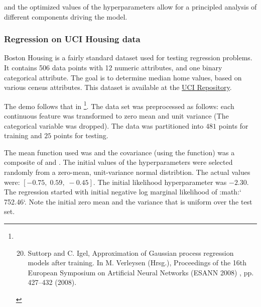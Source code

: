 \documentclass[letterpaper,10pt,english]{sphinxmanual}
\begin{document}
and the optimized values of the hyperparameters allow for a principled analysis of different components driving the model.


\subsubsection{Regression on UCI Housing data}
\label{demoHousing::doc}\label{demoHousing:regression-on-uci-housing-data}\label{demoHousing:gpml}
Boston Housing is a fairly standard dataset used for testing regression problems. It contains 506 data points with 12 numeric attributes, and one binary
categorical attribute.  The goal is to determine median home values, based on various census attributes. This dataset is available at the \href{http://archive.ics.uci.edu/ml/datasets/Housing}{UCI
Repository}.

The demo follows that in \footnote{\begin{enumerate}
\setcounter{enumi}{19}
\item {} 
Suttorp and C. Igel, Approximation of Gaussian process regression models after training. In M. Verleysen (Hrsg.), Proceedings of the 16th European Symposium on Artificial Neural Networks (ESANN 2008) , pp. 427–432 (2008).

\end{enumerate}
}.  The data set was preprocessed as follows: each continuous feature was transformed to zero mean and
unit variance (The categorical variable was dropped).  The data was partitioned into $481$ points for training and $25$ points for testing.

The mean function used was  and the covariance (using the  function) was a composite of
 and .  The initial values of the hyperparameters were selected randomly from a zero-mean,
unit-variance normal distribtion.  The actual values were: $[ -0.75, \; 0.59, \; -0.45 ]$. The initial likelihood hyperparameter
was $-2.30$.  The regression started with initial negative log marginal likelihood of :math:{}` 752.46{}`.  Note the initial zero mean and the
variance that is uniform over the test set.
\end{document}

